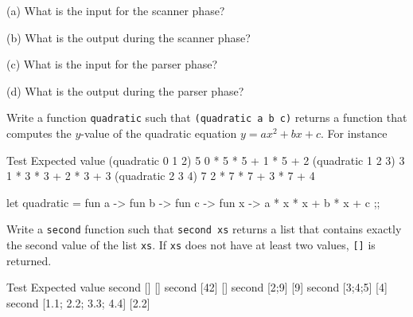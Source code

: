 (a) What is the input for the scanner phase?
\\
\ANSWER
\begin{answercode}

\end{answercode}

(b) What is the output during the scanner phase?
\\
\ANSWER
\begin{answercode}

\end{answercode}

(c) What is the input for the parser phase?
\\
\ANSWER
\begin{answercode}
  
\end{answercode}

(d) What is the output during the parser phase?
\\
\ANSWER
\begin{answercode}

\end{answercode}

\newpage
\nextq
Write a function \verb!quadratic! such that
\verb!(quadratic a b c)! returns a function that computes the $y$-value
of the quadratic equation $y = ax^2 + bx + c$.
For instance 

\begin{console}[frame=none]
        Test                       Expected value
        (quadratic 0 1 2) 5        0 * 5 * 5 + 1 * 5 + 2
        (quadratic 1 2 3) 3        1 * 3 * 3 + 2 * 3 + 3
        (quadratic 2 3 4) 7        2 * 7 * 7 + 3 * 7 + 4
\end{console}

\ANSWER
\begin{answercode}
  
	let quadratic = fun a -> fun b -> fun c -> fun x ->
		a * x * x + b * x + c
	;;

\end{answercode}

\newpage
\nextq
Write a \verb!second! function such that \verb!second xs!
returns a list that contains exactly the second value of
the list \verb!xs!.
If \verb!xs! does not have at least two values, \verb![]! is returned.

\begin{console}[frame=none]
	Test                         Expected value
	second []                    []
    second [42]                  []
	second [2;9]                 [9]
	second [3;4;5]               [4]
    second [1.1; 2.2; 3.3; 4.4]  [2.2]
\end{console}

